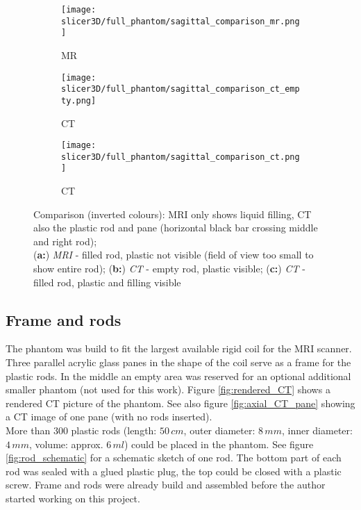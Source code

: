 \begin{figure}[!htb]
\centering
  \begin{subfigure}[b]{0.1\textwidth}
    \texttt{[image: slicer3D/full\_phantom/sagittal\_comparison\_mr.png]}
    \caption{MR}
    \label{fig:sagittal_comparison_mr}
  \end{subfigure}
  \begin{subfigure}[b]{0.1\textwidth}
    \texttt{[image: slicer3D/full\_phantom/sagittal\_comparison\_ct\_empty.png]}
    \caption{CT}
    \label{fig:sagittal_comparison_ct_empty}
  \end{subfigure}
  \begin{subfigure}[b]{0.1\textwidth}
    \texttt{[image: slicer3D/full\_phantom/sagittal\_comparison\_ct.png]}
    \caption{CT}
    \label{fig:sagittal_comparison_ct}
  \end{subfigure}
  \caption{Comparison (inverted colours): MRI only shows liquid filling, CT also the plastic rod and pane (horizontal black bar crossing middle and right rod);\\ (\textbf{a:}) \textit{MRI} - filled rod, plastic not visible (field of view too small to show entire rod); (\textbf{b:}) \textit{CT} - empty rod, plastic visible; (\textbf{c:}) \textit{CT} - filled rod, plastic and filling visible}
  \label{fig:sagittal_comparison}
\end{figure}

\subsection{Frame and rods}

The phantom was build to fit the largest available rigid coil for the MRI scanner.
Three parallel acrylic glass panes in the shape of the coil serve as a frame for the plastic rods.
In the middle an empty area was reserved for an optional additional smaller phantom (not used for this work).
Figure \ref{fig:rendered_CT} shows a rendered CT picture of the phantom. See also figure \ref{fig:axial_CT_pane} showing a CT image of one pane (with no rods inserted). \\
More than 300 plastic rods (length: $50\,cm$, outer diameter: $8\,mm$, inner diameter: $4\,mm$, volume: approx. $6\,ml$) could be placed in the phantom.
See figure \ref{fig:rod_schematic} for a schematic sketch of one rod.
The bottom part of each rod was sealed with a glued plastic plug, the top could be closed with a plastic screw.
Frame and rods were already build and assembled before the author started working on this project.

